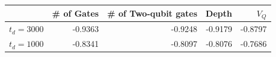 \begin{center}
\begin{tabular}{lrrrr}
\hline
 & \# of Gates & \# of Two-qubit gates & Depth & \(V_Q\)\\
\hline
\(t_d = 3000\) & -0.9363 & -0.9248 & -0.9179 & -0.8797\\
\(t_d = 1000\) & -0.8341 & -0.8097 & -0.8076 & -0.7686\\
\hline
\end{tabular}
\end{center}
